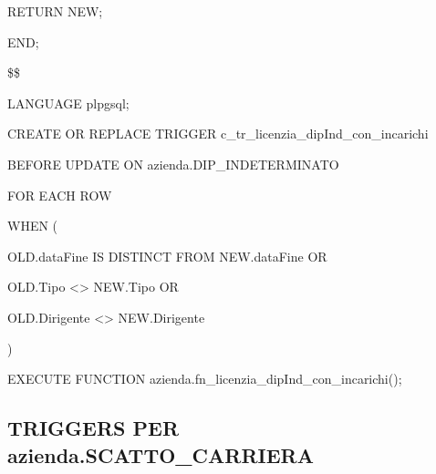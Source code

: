 \begin{flushleft}
\begin{description}
\begin{description}
                        \item RETURN NEW;
                    \end{description}
                    \item END;
                    \item \$\$
                    \item LANGUAGE plpgsql;
                \end{description}
            \end{flushleft}
        \normalfont

        \ttfamily
            \begin{flushleft}
                \begin{description}
                    \item CREATE OR REPLACE TRIGGER c\_tr\_licenzia\_dipInd\_con\_incarichi
                    \item BEFORE UPDATE ON azienda.DIP\_INDETERMINATO
                    \item FOR EACH ROW
                    \item WHEN (
                    \begin{description}
                        \item OLD.dataFine IS DISTINCT FROM NEW.dataFine OR
                        \item OLD.Tipo <> NEW.Tipo OR
                        \item OLD.Dirigente <> NEW.Dirigente
                    \end{description}
                    \item )
                    \item EXECUTE FUNCTION azienda.fn\_licenzia\_dipInd\_con\_incarichi();
                \end{description}
            \end{flushleft}
        \normalfont

\newpage
        
    \subsection{TRIGGERS PER azienda.SCATTO\_CARRIERA}


